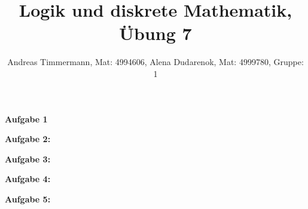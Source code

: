 \documentclass[a4paper]{scrartcl}
\title{Logik und diskrete Mathematik, Übung 7}
\author{Andreas Timmermann, Mat: 4994606, Alena Dudarenok, Mat: 4999780, Gruppe: 1}
\begin{document}
	\maketitle
	\begin{flushleft}
		\textbf{Aufgabe 1}\\
	\end{flushleft}
	\begin{flushleft}
		\textbf{Aufgabe 2:}\\
	\end{flushleft}
	\begin{flushleft}
		\textbf{Aufgabe 3:}\\	
	\end{flushleft}
	\begin{flushleft}
		\textbf{Aufgabe 4:}\\
	\end{flushleft}
	\begin{flushleft}
		\textbf{Aufgabe 5:}\\	
	\end{flushleft}
\end{document}
